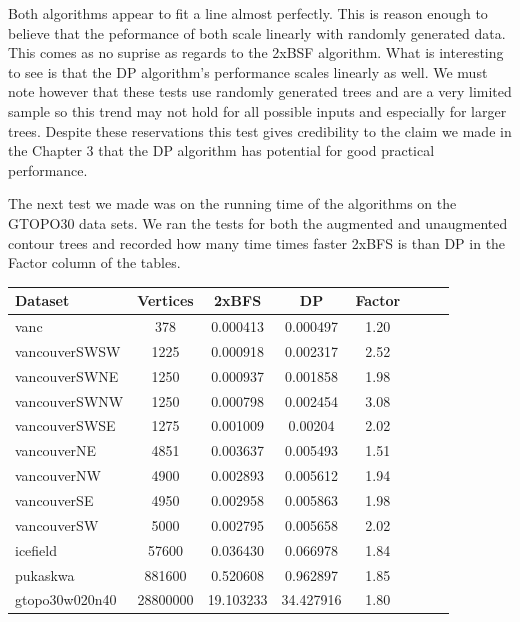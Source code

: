 Both algorithms appear to fit a line almost perfectly. This is reason enough to believe that the peformance of both scale linearly with randomly generated data. This comes as no suprise as regards to the 2xBSF algorithm. What is interesting to see is that the DP algorithm's performance scales linearly as well. We must note however that these tests use randomly generated trees and are a very limited sample so this trend may not hold for all possible inputs and especially for larger trees. Despite these reservations this test gives credibility to the claim we made in the Chapter 3 that the DP algorithm has potential for good practical performance.


The next test we made was on the running time of the algorithms on the GTOPO30 data sets. We ran the tests for both the augmented and unaugmented contour trees and recorded how many time times faster 2xBFS is than DP in the Factor column of the tables.


\begin{center}
\begin{tabular}{l*{6}{c}r}

Dataset            & Vertices        & 2xBFS              & DP                   & Factor \\
\hline
vanc	           & 378	         &0.000413	          & 0.000497	         &1.20    \\
vancouverSWSW	   & 1225	         &0.000918	          & 0.002317	         &2.52    \\
vancouverSWNE	   & 1250	         &0.000937	          & 0.001858	         &1.98    \\
vancouverSWNW	   & 1250	         &0.000798	          & 0.002454	         &3.08    \\
vancouverSWSE	   & 1275	         &0.001009	          & 0.00204	             &2.02    \\
vancouverNE	       & 4851	         &0.003637	          & 0.005493	         &1.51    \\
vancouverNW	       & 4900	         &0.002893	          & 0.005612	         &1.94    \\
vancouverSE	       & 4950	         &0.002958	          & 0.005863	         &1.98    \\
vancouverSW	       & 5000	         &0.002795	          & 0.005658	         &2.02    \\
icefield	       & 57600	         &0.036430	          & 0.066978	         &1.84    \\
pukaskwa	       & 881600	         &0.520608	          & 0.962897	         &1.85    \\
gtopo30w020n40	   & 28800000	     &19.103233	          & 34.427916	         &1.80    \\

\end{tabular}
\end{center}

